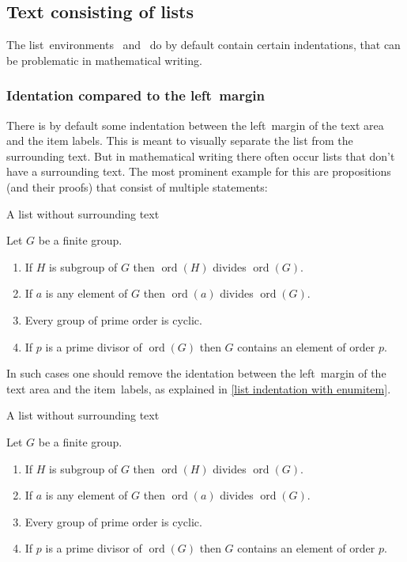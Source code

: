 \subsection{Text consisting of lists}

The list~environments~ and~ do by default contain certain indentations, that can be problematic in mathematical writing.

\subsubsection{Identation compared to the left~margin}

There is by default some indentation between the left~margin of the text area and the item labels.
This is meant to visually separate the list from the surrounding text.
But in mathematical writing there often occur lists that don’t have a surrounding text.
The most prominent example for this are propositions (and their proofs) that consist of multiple statements:
\begin{showlatex}{A list without surrounding text}
\begin{theorem}
  Let $G$ be a finite group.
  \begin{enumerate}
    \item
      If $H$ is subgroup of $G$ then $\operatorname{ord}(H)$ divides $\operatorname{ord}(G)$.
    \item
      If $a$ is any element of $G$ then $\operatorname{ord}(a)$ divides $\operatorname{ord}(G)$.
    \item
      Every group of prime order is cyclic.
    \item
      If $p$ is a prime divisor of $\operatorname{ord}(G)$ then $G$ contains an element of order $p$.
  \end{enumerate}
\end{theorem}
\end{showlatex}

In such cases one should remove the identation between the left~margin of the text area and the item~labels, as explained in \cref{list indentation with enumitem}.
\begin{showlatex}{A list without surrounding text}
\begin{theorem}
  Let $G$ be a finite group.
  \begin{enumerate}[wide = 0pt, leftmargin=*]
    \item
      If $H$ is subgroup of $G$ then $\operatorname{ord}(H)$ divides $\operatorname{ord}(G)$.
    \item
      If $a$ is any element of $G$ then $\operatorname{ord}(a)$ divides $\operatorname{ord}(G)$.
    \item
      Every group of prime order is cyclic.
    \item
      If $p$ is a prime divisor of $\operatorname{ord}(G)$ then $G$ contains an element of order $p$.
  \end{enumerate}
\end{theorem}
\end{showlatex}



